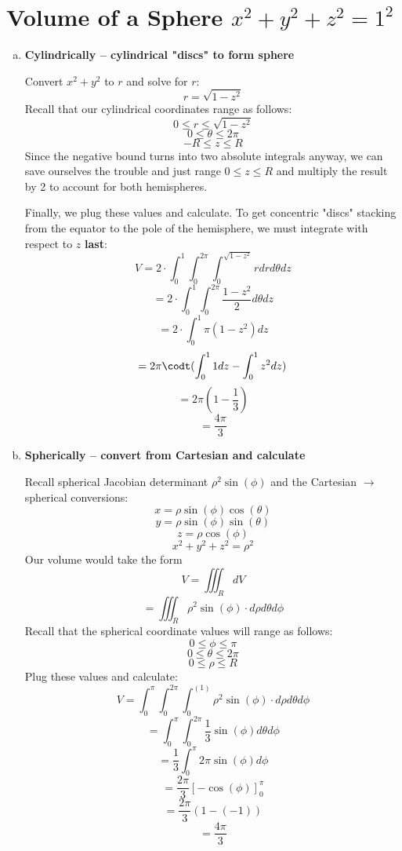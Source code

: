 \documentclass{article}
\begin{document}
\section{Volume of a Sphere $x^2 + y^2 + z^2 = 1^2$}
\begin{enumerate}[a.]
    \item \textbf{Cylindrically -- cylindrical "discs" to form sphere}

          Convert $x^2+y^2$ to $r$ and solve for $r$:
          \[ r=\sqrt{1-z^2}\]
          Recall that our cylindrical coordinates range as follows:
          \[0 \leq r \leq \sqrt{1-z^2}\]
          \[0 \leq \theta \leq 2\pi \]
          \[-R \leq z \leq R \]
          Since the negative  bound turns into two absolute integrals anyway, we can save ourselves the trouble and just range $0 \leq z \leq R$ and multiply the result by 2 to account for both hemispheres.

          Finally, we plug these values and calculate. To get concentric "discs" stacking from the equator to the pole of the hemisphere, we must integrate with respect to $z$ \textbf{last}:
          \[ V = 2\cdot \int _0^1\int _0^{2\pi }\int _0^{\sqrt{1-z^2}}rdrd\theta dz \]
          \[ =2\cdot \int _0^1\int _0^{2\pi }\frac{1-z^2}{2}d\theta dz \]
          \[=2\cdot \int _0^1\pi \left(1-z^2\right)dz\]
          \[=2\pi\codt (\int _0^11dz-\int _0^1z^2dz)\]
          \[=2\pi\left(1-\frac{1}{3}\right)\]
          \[=\frac{4\pi }{3} \]

    \item \textbf{Spherically -- convert from Cartesian and calculate}

          Recall spherical Jacobian determinant $ \rho^2\sin(\phi) $ and the Cartesian $\rightarrow$ spherical conversions:
          \[ x = \rho\sin(\phi)\cos(\theta)   \]
          \[ y = \rho\sin(\phi)\sin(\theta)  \]
          \[ z = \rho\cos(\phi)  \]
          \[ x^2+y^2+z^2 = \rho^2 \]
          Our volume would take the form
          \[ V = \iiint_{R}dV \]
          \[ = \iiint_{R}\rho^2\sin(\phi) \cdot d\rho d\theta d\phi \]
          Recall that the spherical coordinate values will range as follows:
          \[ 0 \leq \phi \leq \pi  \]
          \[ 0 \leq \theta \leq 2\pi  \]
          \[ 0 \leq \rho \leq R \]
          Plug these values and calculate:
          \[ V = \int_{0}^{\pi}\int_{0}^{2\pi}\int_{0}^{(1)}\rho^2\sin(\phi) \cdot d\rho d\theta d\phi \]
          \[ = \int_{0}^{\pi}\int_{0}^{2\pi}\frac{1}{3}\sin(\phi) d\theta d\phi \]
          \[ = \frac{1}{3}\int_{0}^{\pi}2\pi\sin(\phi) d\phi \]
          \[ = \frac{2\pi}{3}\left[-\cos \left(\phi\right)\right]^{\pi }_0\]
          \[ = \frac{2\pi}{3}(1-\left(-1\right))\]
          \[ = \frac{4\pi}{3} \]


\end{enumerate}
\end{document}
